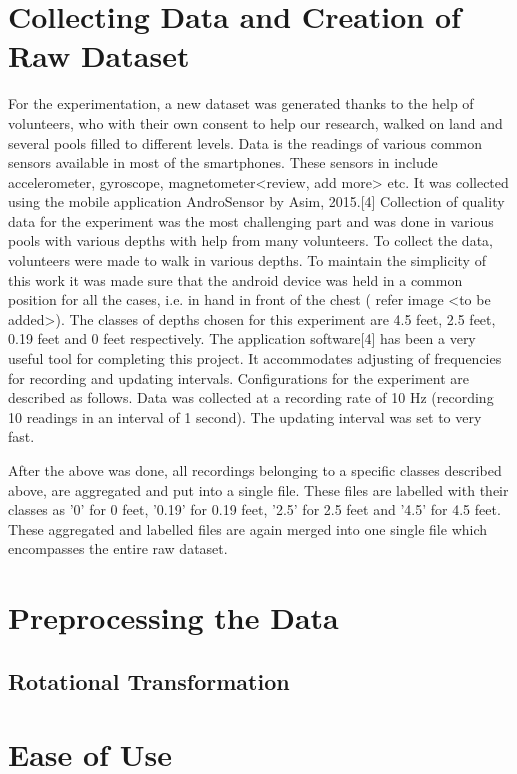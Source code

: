 \documentclass[conference]{IEEEtran}
\begin{document}
\section{Collecting Data and Creation of Raw Dataset}
For the experimentation, a new dataset was generated thanks to the help of volunteers, who with their own consent to help our research, walked on land and several pools filled to different levels. Data is the readings of various common sensors available in most of the smartphones. These sensors in include accelerometer, gyroscope, magnetometer<review, add more> etc. It was collected using the mobile application AndroSensor by Asim, 2015.[4] Collection of quality data for the experiment was the most challenging part and was done in various pools with various depths with help from many volunteers. To collect the data, volunteers were made to walk in various depths. To maintain the simplicity of this work it was made sure that the android device was held in a common position for all the cases, i.e. in hand in front of the chest ( refer image <to be added>). The classes of depths chosen for this experiment are 4.5 feet, 2.5 feet, 0.19 feet and 0 feet respectively. The application software[4] has been a very useful tool for completing this project. It accommodates adjusting of frequencies for recording and updating intervals. Configurations for the experiment are described as follows. Data was collected at a recording rate of 10 Hz (recording 10 readings in an interval of 1 second). The updating interval was set to very fast. 

After the above was done, all recordings belonging to a specific classes described above, are aggregated and put into a single file. These files are labelled with their classes as '0' for 0 feet, '0.19' for 0.19 feet, '2.5' for 2.5 feet and '4.5' for 4.5 feet. These aggregated and labelled files are again merged into one single file which encompasses the entire raw dataset.

\section{Preprocessing the Data}
\subsection{Rotational Transformation}



\section{Ease of Use}
\end{document}
